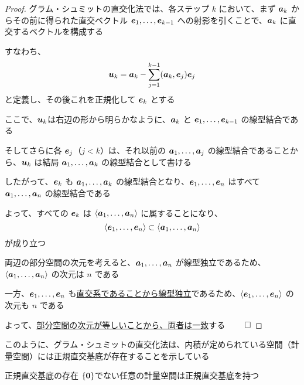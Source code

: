 \documentclass[../../../topic_linear-algebra]{subfiles}
\begin{document}
\begin{proof}
  グラム・シュミットの直交化法では、各ステップ $k$ において、まず $\vb*{a}_k$ からその前に得られた直交ベクトル $\vb*{e}_1, \ldots, \vb*{e}_{k-1}$ への射影を引くことで、$\vb*{a}_k$ に直交するベクトルを構成する

  すなわち、
  \begin{equation*}
    \vb*{u}_k = \vb*{a}_k - \sum_{j=1}^{k-1} (\vb*{a}_k, \vb*{e}_j) \vb*{e}_j
  \end{equation*}
  と定義し、その後これを正規化して $\vb*{e}_k$ とする

  \br

  ここで、$\vb*{u}_k$は右辺の形から明らかなように、$\vb*{a}_k$ と $\vb*{e}_1, \ldots, \vb*{e}_{k-1}$ の線型結合である

  そしてさらに各 $\vb*{e}_j$（$j < k$）は、それ以前の $\vb*{a}_1, \ldots, \vb*{a}_j$ の線型結合であることから、$\vb*{u}_k$ は結局 $\vb*{a}_1, \ldots, \vb*{a}_k$ の線型結合として書ける

  したがって、$\vb*{e}_k$ も $\vb*{a}_1, \ldots, \vb*{a}_k$ の線型結合となり、$\vb*{e}_1, \ldots, \vb*{e}_n$ はすべて $\vb*{a}_1, \ldots, \vb*{a}_n$ の線型結合である

  \br

  よって、すべての $\vb*{e}_k$ は $\langle \vb*{a}_1, \ldots, \vb*{a}_n \rangle$ に属することになり、
  \begin{equation*}
    \langle \vb*{e}_1, \ldots, \vb*{e}_n \rangle \subset \langle \vb*{a}_1, \ldots, \vb*{a}_n \rangle
  \end{equation*}
  が成り立つ

  \br

  両辺の部分空間の次元を考えると、$\vb*{a}_1, \ldots, \vb*{a}_n$ が線型独立であるため、$\langle \vb*{a}_1, \ldots, \vb*{a}_n \rangle$ の次元は $n$ である

  一方、$\vb*{e}_1, \ldots, \vb*{e}_n$ も\hyperref[thm:orthogonal-set-is-independent]{直交系であることから線型独立}であるため、$\langle \vb*{e}_1, \ldots, \vb*{e}_n \rangle$ の次元も $n$ である

  よって、\hyperref[thm:equal-dim-implies-equal-subspace]{部分空間の次元が等しいことから、両者は一致}する $\qed$
\end{proof}

\br

このように、グラム・シュミットの直交化法は、内積が定められている空間（計量空間）には正規直交基底が存在することを示している

\begin{theorem}{正規直交基底の存在}
  $\{\vb*{0}\}$でない任意の計量空間は正規直交基底を持つ
\end{theorem}
\end{document}
